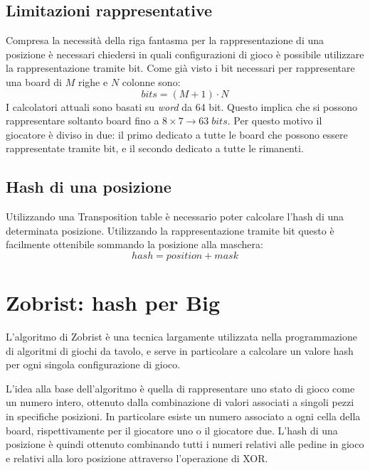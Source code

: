\documentclass[a4paper]{article}
\begin{document}

\subsection{Limitazioni rappresentative}
Compresa la necessità della riga fantasma per la rappresentazione di una 
posizione è necessari chiedersi in quali configurazioni di gioco è possibile
utilizzare la rappresentazione tramite bit. Come già visto i bit necessari per
rappresentare una board di $M$ righe e $N$ colonne sono:
\begin{equation*}
  bits = (M + 1) \cdot N
\end{equation*}
I calcolatori attuali sono basati su \emph{word} da 64 bit. Questo implica che
si possono rappresentare soltanto board fino a $8 \times 7 \xrightarrow{} 63\; 
bits$. Per questo motivo il giocatore è diviso in due: il primo dedicato a tutte 
le board che possono essere rappresentate tramite bit, e il secondo dedicato a 
tutte le rimanenti.

\subsection{Hash di una posizione}
Utilizzando una Transposition table è necessario poter calcolare l'hash di una
determinata posizione. Utilizzando la rappresentazione tramite bit questo è 
facilmente ottenibile sommando la posizione alla maschera:
\begin{equation*}
  hash = position + mask
\end{equation*}

\section{Zobrist: hash per Big}
L'algoritmo di Zobrist è una tecnica largamente utilizzata nella programmazione
di algoritmi di giochi da tavolo, e serve in particolare a calcolare un valore
hash per ogni singola configurazione di gioco.

L'idea alla base dell'algoritmo è quella di rappresentare uno stato di gioco
come un numero intero, ottenuto dalla combinazione di valori associati a 
singoli pezzi in specifiche posizioni. In particolare esiste un numero associato
a ogni cella della board, rispettivamente per il giocatore uno o il giocatore 
due. L'hash di una posizione è quindi ottenuto combinando tutti i numeri 
relativi alle pedine in gioco e relativi alla loro posizione attraverso 
l'operazione di XOR.\medskip
\end{document}
